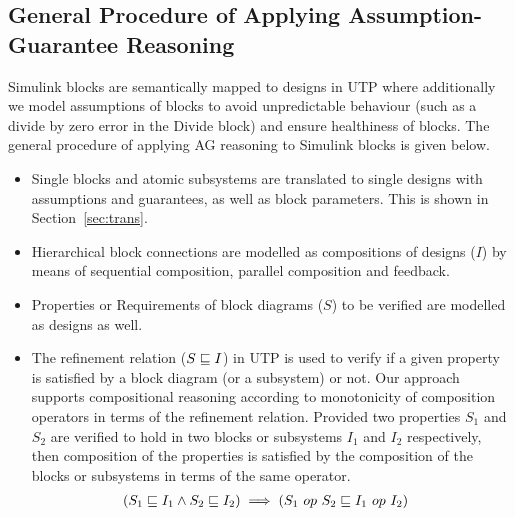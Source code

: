 \subsection{General Procedure of Applying Assumption-Guarantee Reasoning}
Simulink blocks are semantically mapped to designs in UTP where additionally we model assumptions of blocks to avoid unpredictable behaviour (such as a divide by zero error in the Divide block) and ensure healthiness of blocks. The general procedure of applying AG reasoning to Simulink blocks is given below.

\begin{itemize}
    \item Single blocks and atomic subsystems are translated to single designs with assumptions and guarantees, as well as block parameters. This is shown in Section~\ref{sec:trans}.
    \item Hierarchical block connections are modelled as compositions of designs ($I$) by means of sequential composition, parallel composition and feedback.
    \item Properties or Requirements of block diagrams ($S$) to be verified are modelled as designs as well.
    \item The refinement relation ($S \refinedby I$) in UTP is used to verify if a given property is satisfied by a block diagram (or a subsystem) or not. Our approach supports compositional reasoning according to monotonicity of composition operators in terms of the refinement relation. Provided two properties $S_1$ and $S_2$ are verified to hold in two blocks or subsystems $I_1$ and $I_2$ respectively, then composition of the properties is satisfied by the composition of the blocks or subsystems in terms of the same operator.
   \begin{align*}
      & \left(S_1 \refinedby I_1 \land  S_2 \refinedby I_2\right) \implies \left(S_1 \ op\ S_2 \refinedby I_1 \ op\ I_2\right) &
   \end{align*}
\end{itemize}
